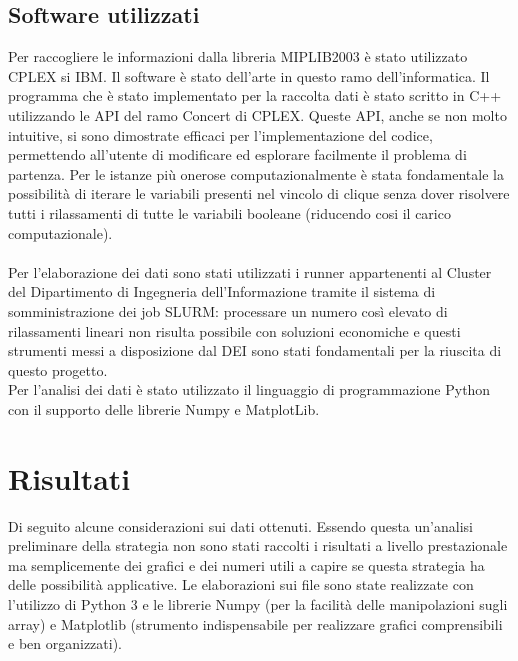 \documentclass[12pt,a4paper,twoside,openright]{book}
\begin{document}
\section{Software utilizzati}
Per raccogliere le informazioni dalla libreria MIPLIB2003 è stato utilizzato CPLEX si IBM.
Il software è stato dell'arte in questo ramo dell'informatica.
Il programma che è stato implementato per la raccolta dati è stato scritto in C++ utilizzando 
le API del ramo Concert di CPLEX. Queste API, anche se non molto intuitive,
si sono dimostrate efficaci per l'implementazione del codice, permettendo all'utente di 
modificare ed esplorare facilmente il problema di partenza. Per le istanze più onerose 
computazionalmente è stata fondamentale la possibilità di iterare le variabili presenti nel
vincolo di clique senza dover risolvere tutti i rilassamenti di tutte le variabili booleane 
(riducendo cosi il carico computazionale).\\\\

Per l'elaborazione dei dati sono stati utilizzati i runner appartenenti al Cluster del Dipartimento di Ingegneria 
dell'Informazione tramite il sistema di somministrazione dei job SLURM: 
processare un numero così elevato di rilassamenti lineari non risulta possibile con soluzioni 
economiche e questi strumenti messi a disposizione dal DEI sono stati fondamentali per 
la riuscita di questo progetto.
\\
Per l'analisi dei dati è stato utilizzato il linguaggio di programmazione Python con il supporto delle librerie Numpy e MatplotLib.

\chapter{Risultati}
Di seguito alcune considerazioni sui dati ottenuti. Essendo questa un'analisi preliminare della strategia
non sono stati raccolti i risultati a livello prestazionale ma semplicemente dei grafici e dei numeri 
utili a capire se questa strategia ha delle possibilità applicative. Le elaborazioni sui file sono state
realizzate con l'utilizzo di Python 3 e le librerie Numpy (per la facilità delle manipolazioni sugli array)
e Matplotlib (strumento indispensabile per realizzare grafici comprensibili e ben organizzati).
\end{document}
